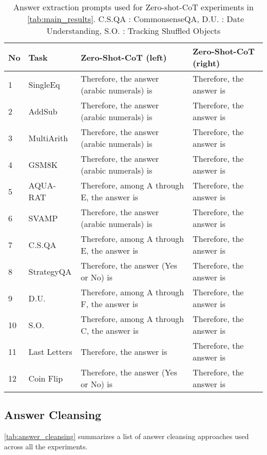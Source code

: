 \documentclass{article}
\newcommand{\ours}{Zero-shot-CoT\xspace}
\begin{document}
\begin{table}[h]\centering
\caption{Answer extraction prompts used for \ours experiments in ~\autoref{tab:main_results}. C.S.QA : CommonsenseQA, D.U. : Date Understanding, S.O. : Tracking Shuffled Objects}
\label{tab:answer_prompts_2}
\begin{tabular}{p{}p{}p{}p{}}
\toprule

No &Task &Zero-Shot-CoT (left) &Zero-Shot-CoT (right) \\

\midrule

1 &SingleEq &Therefore, the answer (arabic numerals) is &Therefore, the answer is \\
2 &AddSub &Therefore, the answer (arabic numerals) is &Therefore, the answer is \\
3 &MultiArith &Therefore, the answer (arabic numerals) is &Therefore, the answer is \\
4 &GSM8K &Therefore, the answer (arabic numerals) is &Therefore, the answer is \\
5 &AQUA-RAT &Therefore, among A through E, the answer is &Therefore, the answer is \\
6 &SVAMP &Therefore, the answer (arabic numerals) is &Therefore, the answer is \\
7 &C.S.QA &Therefore, among A through E, the answer is &Therefore, the answer is \\
8 &StrategyQA &Therefore, the answer (Yes or No) is &Therefore, the answer is \\
9 &D.U. &Therefore, among A through F, the answer is &Therefore, the answer is \\
10 &S.O. &Therefore, among A through C, the answer is &Therefore, the answer is \\
11 &Last Letters &Therefore, the answer is &Therefore, the answer is \\
12 &Coin Flip &Therefore, the answer (Yes or No) is &Therefore, the answer is \\
\bottomrule
\end{tabular}
\end{table} 
\subsection{Answer Cleansing}
\label{appx:answer_cleansing}

\autoref{tab:answer_cleansing} summarizes a list of answer cleansing approaches used across all the experiments.
\end{document}
